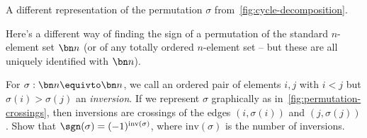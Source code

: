 \begin{marginfigure}
  \caption{A different representation of the permutation $\sigma$
    from~\cref{fig:cycle-decomposition}.}
  \label{fig:permutation-crossings}
\end{marginfigure}
\begin{xca}\label{xca:sign-by-crossings}
  Here's a different way of finding the sign of a permutation of the standard $n$-element set $\bn n$
  (or of any totally ordered $n$-element set
  -- but these are all uniquely identified with $\bn n$).

  For $\sigma : \bn n \equivto \bn n$, we call an ordered pair of elements $i,j$
  with $i<j$ but $\sigma(i)>\sigma(j)$ an \emph{inversion}.
  If we represent $\sigma$ graphically as in~\cref{fig:permutation-crossings},
  then inversions are crossings of the edges $(i,\sigma(i))$ and $(j,\sigma(j))$.
  Show that $\sgn(\sigma) = (-1)^{\mathrm{inv}(\sigma)}$,
  where $\mathrm{inv}(\sigma)$ is the number of inversions.
\end{xca}
